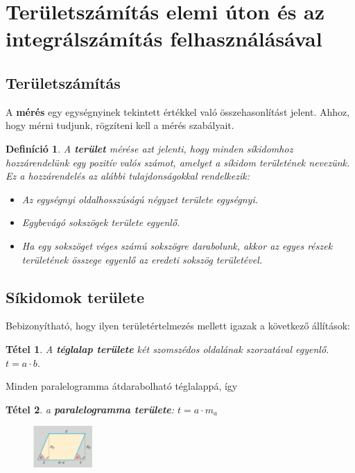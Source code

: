 \documentclass[12pt,a4paper]{article}
\newtheorem{theorem}{Tétel} [section]
\newtheorem{definition}{Definíció} [section]
\begin{document}
\section{Területszámítás elemi úton és az integrálszámítás felhasználásával}
\subsection{Területszámítás}
A \textbf{mérés} egy egységnyinek tekintett értékkel való összehasonlítást jelent. Ahhoz, hogy mérni tudjunk, rögzíteni kell a mérés szabályait.
\begin{definition}
A \textbf{terület} mérése azt jelenti, hogy minden síkidomhoz hozzárendelünk egy pozitív valós számot, amelyet a síkidom területének nevezünk. Ez a hozzárendelés az alábbi tulajdonságokkal rendelkezik:
\begin{itemize}
\item Az egységnyi oldalhosszúságú négyzet területe egységnyi.
\item Egybevágó sokszögek területe egyenlő.
\item  Ha egy sokszöget véges számú sokszögre darabolunk, akkor az egyes részek területének összege egyenlő az eredeti sokszög területével.
\end{itemize}
\end{definition}

\subsection{Síkidomok területe}
Bebizonyítható, hogy ilyen területértelmezés mellett igazak a következő állítások:
\begin{theorem}
A \textbf{téglalap területe} két szomszédos oldalának szorzatával egyenlő. $t = a \cdot b$.
\end{theorem}
Minden paralelogramma átdarabolható téglalappá, így
\begin{theorem}
a \textbf{paralelogramma területe}: $t=a\cdot m_a$
\end{theorem}

\begin{figure}[h]
\centering
\includegraphics[width=0.2\textwidth]{paralelogramma_terulete}
\end{figure}
\end{document}
